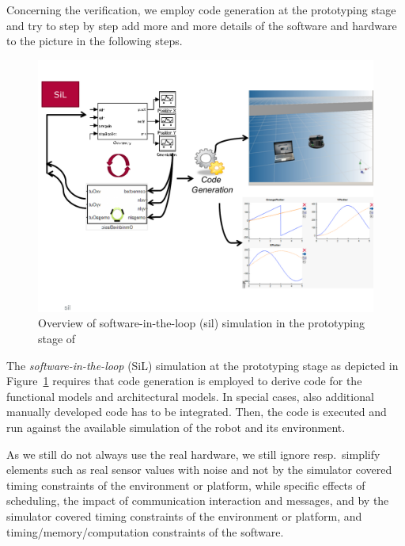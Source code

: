 %
Concerning the verification, we employ code generation at the prototyping stage and try to step by step add more and more details of the software and hardware to the picture in the following steps.

\begin{figure}[!htb]
\centering
\includegraphics[scale=0.33]{figures/sil.pdf}
\caption{Overview of software-in-the-loop (sil) simulation in the prototyping stage of \cite{Broekman&Notenboom2003}}
\label{fig:sil}
\end{figure}



%
The \emph{software-in-the-loop} (SiL) simulation at the prototyping stage as depicted in Figure~\ref{fig:sil} requires that code generation is employed to derive code for the functional models and architectural models. In special cases, also additional manually developed code has to be integrated. Then, the code is executed and run against the available simulation of the robot and its environment.

As we still do not always use the real hardware, we still ignore resp.~simplify elements such as real sensor values with noise and not by the simulator covered timing constraints of the environment or platform, while specific effects of scheduling, the impact of communication interaction and messages, and by the simulator covered timing constraints of the environment or platform, and timing/memory/computation constraints of the software.

